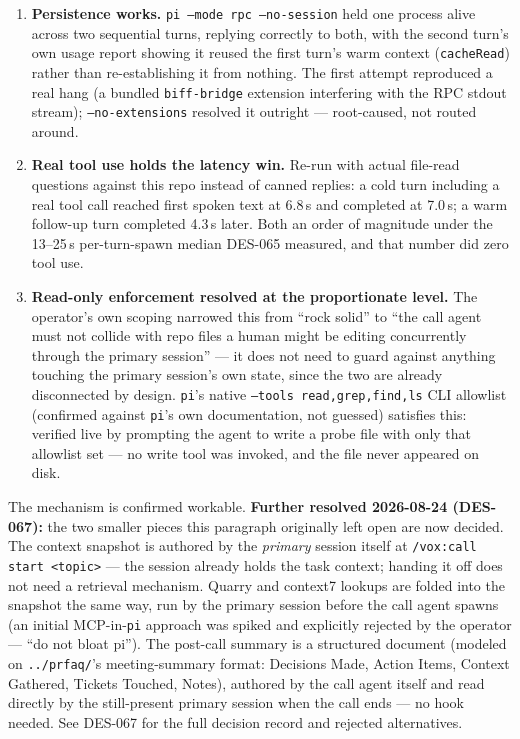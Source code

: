 \documentclass[a4paper,11pt]{report}
\begin{document}
\begin{enumerate}
  \item \textbf{Persistence works.} \texttt{pi --mode rpc --no-session}
    held one process alive across two sequential turns, replying
    correctly to both, with the second turn's own usage report showing it
    reused the first turn's warm context (\texttt{cacheRead}) rather than
    re-establishing it from nothing. The first attempt reproduced a real
    hang (a bundled \texttt{biff-bridge} extension interfering with the
    RPC stdout stream); \texttt{--no-extensions} resolved it outright ---
    root-caused, not routed around.
  \item \textbf{Real tool use holds the latency win.} Re-run with actual
    file-read questions against this repo instead of canned replies: a
    cold turn including a real tool call reached first spoken text at
    6.8\,s and completed at 7.0\,s; a warm follow-up turn completed 4.3\,s
    later. Both an order of magnitude under the 13--25\,s per-turn-spawn
    median DES-065 measured, and that number did zero tool use.
  \item \textbf{Read-only enforcement resolved at the proportionate
    level.} The operator's own scoping narrowed this from ``rock solid''
    to ``the call agent must not collide with repo files a human might be
    editing concurrently through the primary session'' --- it does not
    need to guard against anything touching the primary session's own
    state, since the two are already disconnected by design.
    \texttt{pi}'s native \texttt{--tools read,grep,find,ls} CLI allowlist
    (confirmed against \texttt{pi}'s own documentation, not guessed)
    satisfies this: verified live by prompting the agent to write a probe
    file with only that allowlist set --- no write tool was invoked, and
    the file never appeared on disk.
\end{enumerate}

The mechanism is confirmed workable. \textbf{Further resolved
2026-08-24 (DES-067):} the two smaller pieces this paragraph originally
left open are now decided. The context snapshot is authored by the
\emph{primary} session itself at \texttt{/vox:call start <topic>} --- the
session already holds the task context; handing it off does not need a
retrieval mechanism. Quarry and context7 lookups are folded into the
snapshot the same way, run by the primary session before the call agent
spawns (an initial MCP-in-\texttt{pi} approach was spiked and explicitly
rejected by the operator --- ``do not bloat pi''). The post-call summary
is a structured document (modeled on \texttt{../prfaq/}'s meeting-summary
format: Decisions Made, Action Items, Context Gathered, Tickets Touched,
Notes), authored by the call agent itself and read directly by the
still-present primary session when the call ends --- no hook needed.
See DES-067 for the full decision record and rejected alternatives.
\end{document}
